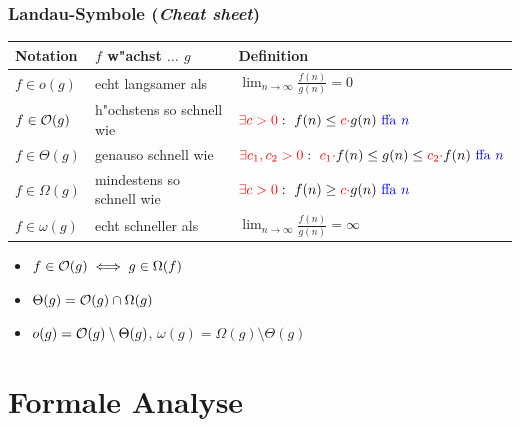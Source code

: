 \begin{frame}
  \frametitle{Landau-Symbole (\emph{Cheat sheet})}
  \begin{center}
  \begin{tabular}{| l || l | l |} \hline
  \textbf{Notation} & \textbf{$f$ w"achst $\ldots$ $g$} & \textbf{Definition} \\ \hline
  $f \in o(g)$
      & echt langsamer als
      & $\lim_{n\rightarrow \infty} \frac{f(n)}{g(n)} = 0$
      \\ \hline
  $f \in \mathcal{O}(g)$
      & \footnotesize h"ochstens so schnell wie \normalsize
      & $\textcolor{red}{\exists c > 0}: \
          f(n) \leq \textcolor{red}{c\cdot} g(n) \textcolor{blue}{\text{ ffa } n}$
      \\ \hline
  $f \in \Theta(g)$
      & genauso schnell wie
      & \footnotesize $\textcolor{red}{\exists c_1, c_2 > 0}:
        \ \textcolor{red}{c_1\cdot} f(n)
            \leq g(n)
            \leq \textcolor{red}{c_2 \cdot} f(n)
          \textcolor{blue}{\text{ ffa } n}$ \normalsize
      \\ \hline
  $f \in \Omega(g)$
      & \footnotesize mindestens so schnell wie \normalsize
      & $\textcolor{red}{\exists c > 0}: \ f(n) \geq \textcolor{red}{c\cdot} g(n) \textcolor{blue}{\text{ ffa } n}$
      \\ \hline
  $f \in \omega(g)$
      & echt schneller als
      & $\lim_{n\rightarrow \infty} \frac{f(n)}{g(n)} = \infty$
      \\ \hline
  \end{tabular}
  \end{center}
  \begin{itemize}
  \item $f \in \mathcal{O}(g) \iff g \in \Omega(f)$
  \item $\Theta(g) = \mathcal{O}(g) \cap \Omega(g)$
  \item $o(g) = \mathcal{O}(g) \setminus \Theta(g)$, $\omega(g) = \Omega(g) \setminus \Theta(g)$
  \end{itemize}
\end{frame}

\section{Formale Analyse}

